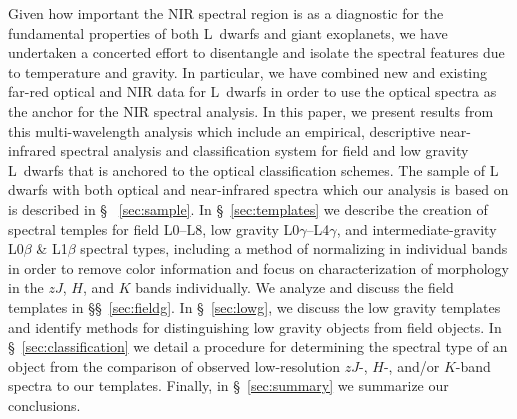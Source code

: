 \documentclass[12pt,preprint]{aastex}
\newcommand{\sample}{180}
\begin{document}
Given how important the NIR spectral region is as a diagnostic for the fundamental properties of both L~dwarfs and giant exoplanets, we have undertaken a concerted effort to disentangle and isolate the spectral features due to temperature and gravity. 
In particular, we have combined new and existing far-red optical and NIR data for L~dwarfs in order to use the optical spectra as the anchor for the NIR spectral analysis. 
In this paper, we present results from this multi-wavelength analysis which include an empirical, descriptive near-infrared spectral analysis and classification system for field and low gravity L~dwarfs that is anchored to the optical classification schemes. 
The sample of L dwarfs with both optical and near-infrared spectra which our analysis is based on is described in \S~ \ref{sec:sample}. 
In \S~\ref{sec:templates} we describe the creation of spectral temples for field L0--L8, low gravity L0$\gamma$--L4$\gamma$, and intermediate-gravity L0$\beta$ \& L1$\beta$ spectral types, including a method of normalizing in individual bands in order to remove color information and focus on characterization of morphology in the $zJ$, $H$, and $K$ bands individually. 
We analyze and discuss the field templates in \S\S~\ref{sec:fieldg}. 
In \S~\ref{sec:lowg}, we discuss the low gravity templates and identify methods for distinguishing low gravity objects from field objects. 
In \S~\ref{sec:classification} we detail a procedure for determining the spectral type of an object from the comparison of observed low-resolution $zJ$-, $H$-, and/or $K$-band spectra to our templates.
Finally, in \S~\ref{sec:summary} we summarize our conclusions.

\end{document}
